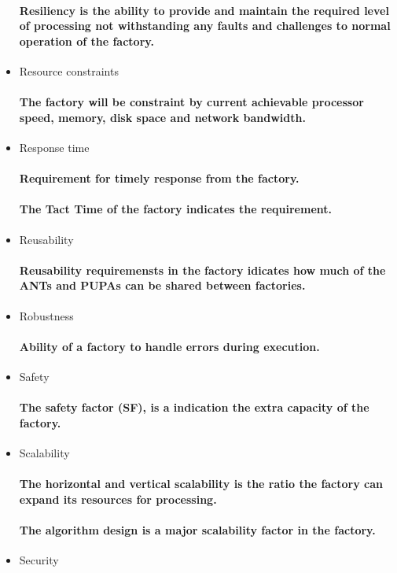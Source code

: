 \begin{itemize}
  \paragraph{Resiliency is the ability to provide and maintain the required level of processing not withstanding any faults and challenges to normal operation of the factory.}
  \item Resource constraints
  \paragraph{The factory will be constraint by current achievable processor speed, memory, disk space and network bandwidth.}
  \item Response time
  \paragraph{Requirement for timely response from the factory.}
  \paragraph{The Tact Time of the factory indicates the requirement.}
  \item Reusability
  \paragraph{Reusability requiremensts in the factory idicates how much of the ANTs and PUPAs can be shared between factories.}
  \item Robustness
  \paragraph{Ability of a factory to handle errors during execution.}
  \item Safety
  \paragraph{The safety factor (SF), is a indication the extra capacity of the factory.}
  \item Scalability
  \paragraph{The horizontal and vertical scalability is the ratio the factory can expand its resources for processing.}
  \paragraph{The algorithm design is a major scalability factor in the factory.}
  \item Security

\end{itemize}
